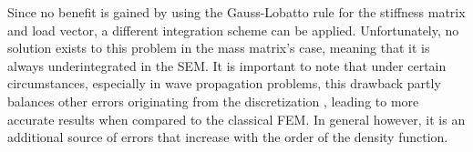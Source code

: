 Since no benefit is gained by using the Gauss-Lobatto rule for the stiffness matrix and load vector, a different integration scheme can be applied. Unfortunately, no solution exists to this problem in the mass matrix's case, meaning that it is always underintegrated in the SEM. It is important to note that under certain circumstances, especially in wave propagation problems, this drawback partly balances other errors originating from the discretization \cite{Ainsworth2010}, leading to more accurate results when compared to the classical FEM. In general however, it is an additional source of errors that increase with the order of the density function.
